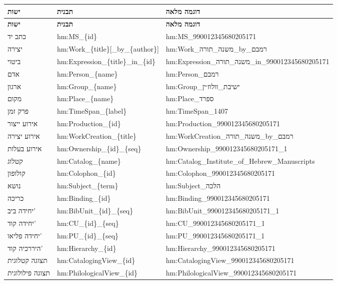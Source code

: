 \documentclass[12pt,a4paper]{article}
\begin{document}
\begin{longtable}{|p{2cm}|L{4cm}|L{10cm}|}
\hline
\textbf{ישות} & \textbf{תבנית} & \textbf{דוגמה מלאה} \\
\hline
\endfirsthead
\hline
\textbf{ישות} & \textbf{תבנית} & \textbf{דוגמה מלאה} \\
\hline
\endhead
\hline
\endfoot
כתב יד & hm:MS\_\{id\} & hm:MS\_990012345680205171 \\
\hline
יצירה & hm:Work\_\{title\}[\_by\_\{author\}] & hm:Work\_משנה\_תורה\_by\_רמבם \\
\hline
ביטוי & hm:Expression\_\{title\}\_in\_\{id\} & hm:Expression\_משנה\_תורה\_in\_990012345680205171 \\
\hline
אדם & hm:Person\_\{name\} & hm:Person\_רמבם \\
\hline
ארגון & hm:Group\_\{name\} & hm:Group\_ישיבת\_וולוז׳ין \\
\hline
מקום & hm:Place\_\{name\} & hm:Place\_ספרד \\
\hline
פרק זמן & hm:TimeSpan\_\{label\} & hm:TimeSpan\_1407 \\
\hline
אירוע ייצור & hm:Production\_\{id\} & hm:Production\_990012345680205171 \\
\hline
אירוע יצירה & hm:WorkCreation\_\{title\} & hm:WorkCreation\_משנה\_תורה\_by\_רמבם \\
\hline
אירוע בעלות & hm:Ownership\_\{id\}\_\{seq\} & hm:Ownership\_990012345680205171\_1 \\
\hline
קטלוג & hm:Catalog\_\{name\} & hm:Catalog\_Institute\_of\_Hebrew\_Manuscripts \\
\hline
קולופון & hm:Colophon\_\{id\} & hm:Colophon\_990012345680205171 \\
\hline
נושא & hm:Subject\_\{term\} & hm:Subject\_הלכה \\
\hline
כריכה & hm:Binding\_\{id\} & hm:Binding\_990012345680205171 \\
\hline
יחידה ביב' & hm:BibUnit\_\{id\}\_\{seq\} & hm:BibUnit\_990012345680205171\_1 \\
\hline
יחידה קוד' & hm:CU\_\{id\}\_\{seq\} & hm:CU\_990012345680205171\_1 \\
\hline
יחידה פליאו' & hm:PU\_\{id\}\_\{seq\} & hm:PU\_990012345680205171\_1 \\
\hline
היררכיה קוד' & hm:Hierarchy\_\{id\} & hm:Hierarchy\_990012345680205171 \\
\hline
תצוגה קטלוגית & hm:CatalogingView\_\{id\} & hm:CatalogingView\_990012345680205171 \\
\hline
תצוגה פילולוגית & hm:PhilologicalView\_\{id\} & hm:PhilologicalView\_990012345680205171 \\

\end{longtable}
\end{document}
